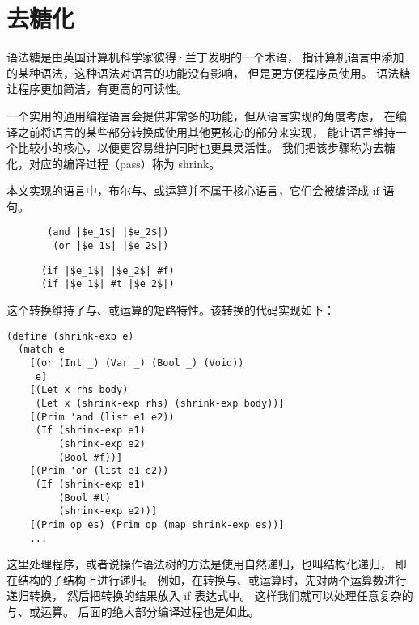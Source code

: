 
\section{去糖化}

语法糖是由英国计算机科学家彼得·兰丁发明的一个术语，
指计算机语言中添加的某种语法，这种语法对语言的功能没有影响，
但是更方便程序员使用。
语法糖让程序更加简洁，有更高的可读性。

一个实用的通用编程语言会提供非常多的功能，但从语言实现的角度考虑，
在编译之前将语言的某些部分转换成使用其他更核心的部分来实现，
能让语言维持一个比较小的核心，以便更容易维护同时也更具灵活性。
我们把该步骤称为去糖化，对应的编译过程（pass）称为 shrink。

本文实现的语言中，布尔与、或运算并不属于核心语言，它们会被编译成 if 语句。
\begin{transformation}
\begin{lstlisting}
       (and |$e_1$| |$e_2$|)
        (or |$e_1$| |$e_2$|)
\end{lstlisting}
\compilesto
\begin{lstlisting}
      (if |$e_1$| |$e_2$| #f)
      (if |$e_1$| #t |$e_2$|)
\end{lstlisting}
\end{transformation}


\begin{comment}
\begin{align*}
  \CAND{e_1}{e_2} & \quad \Rightarrow \quad \CIF{e_1}{e_2}{\FALSE{}}\\
  \COR{e_1}{e_2} & \quad \Rightarrow \quad \CIF{e_1}{\TRUE{}}{e_2}
\end{align*}
\end{comment}

\begin{comment}
\begin{transformation}
\CAND{e_1}{e_2}
\compilesto
\CIF{e_1}{e_2}{\FALSE{}}
\end{transformation}
\end{comment}


这个转换维持了与、或运算的短路特性。该转换的代码实现如下：

\begin{multilinecode}
\begin{lstlisting}
(define (shrink-exp e)
  (match e
    [(or (Int _) (Var _) (Bool _) (Void))
     e]
    [(Let x rhs body)
     (Let x (shrink-exp rhs) (shrink-exp body))]
    [(Prim 'and (list e1 e2))
     (If (shrink-exp e1)
         (shrink-exp e2)
         (Bool #f))]
    [(Prim 'or (list e1 e2))
     (If (shrink-exp e1)
         (Bool #t)
         (shrink-exp e2))]
    [(Prim op es) (Prim op (map shrink-exp es))]
    ...
\end{lstlisting}
\end{multilinecode}

这里处理程序，或者说操作语法树的方法是使用自然递归，也叫结构化递归，
即在结构的子结构上进行递归。
例如，在转换与、或运算时，先对两个运算数进行递归转换，
然后把转换的结果放入 if 表达式中。
这样我们就可以处理任意复杂的与、或运算。
后面的绝大部分编译过程也是如此。
